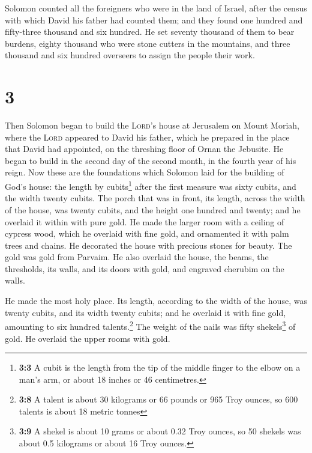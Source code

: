  Solomon counted all the foreigners who were in the land
of Israel, after the census with which David his father had counted
them; and they found one hundred and fifty-three thousand and six
hundred.  He set seventy thousand of them to bear
burdens, eighty thousand who were stone cutters in the mountains, and
three thousand and six hundred overseers to assign the people their
work.

\hypertarget{section-2}{%
\section{3}\label{section-2}}

 Then Solomon began to build the \textsc{Lord}'s house at
Jerusalem on Mount Moriah, where the \textsc{Lord} appeared to David his
father, which he prepared in the place that David had appointed, on the
threshing floor of Ornan the Jebusite.  He began to build
in the second day of the second month, in the fourth year of his reign.
 Now these are the foundations which Solomon laid for the
building of God's house: the length by cubits\footnote{\textbf{3:3} A
  cubit is the length from the tip of the middle finger to the elbow on
  a man's arm, or about 18 inches or 46 centimetres.} after the first
measure was sixty cubits, and the width twenty cubits. 
The porch that was in front, its length, across the width of the house,
was twenty cubits, and the height one hundred and twenty; and he
overlaid it within with pure gold.  He made the larger
room with a ceiling of cypress wood, which he overlaid with fine gold,
and ornamented it with palm trees and chains.  He
decorated the house with precious stones for beauty. The gold was gold
from Parvaim.  He also overlaid the house, the beams, the
thresholds, its walls, and its doors with gold, and engraved cherubim on
the walls.

 He made the most holy place. Its length, according to the
width of the house, was twenty cubits, and its width twenty cubits; and
he overlaid it with fine gold, amounting to six hundred
talents.\footnote{\textbf{3:8} A talent is about 30 kilograms or 66
  pounds or 965 Troy ounces, so 600 talents is about 18 metric tonnes}
 The weight of the nails was fifty shekels\footnote{\textbf{3:9}
  A shekel is about 10 grams or about 0.32 Troy ounces, so 50 shekels
  was about 0.5 kilograms or about 16 Troy ounces.} of gold. He overlaid
the upper rooms with gold.

